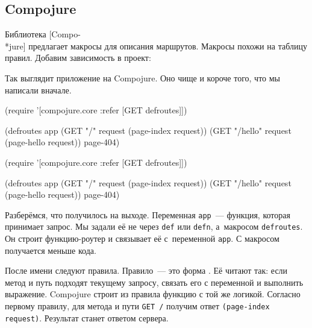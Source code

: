 \subsection{Compojure}

\label{compojure}


Библиотека [Compo-\\*jure]
предлагает макросы для описания маршрутов. Макросы похожи на таблицу правил.
Добавим зависимость в проект:

\begin{english}
  \begin{clojure}
[compojure "1.6.1"]
  \end{clojure}
\end{english}

Так выглядит приложение на Compojure. Оно чище и короче того, что мы написали
вначале.

\ifnarrow

\begin{english}
  \begin{clojure}
(require '[compojure.core
           :refer [GET defroutes]])

(defroutes app
  (GET "/" request
    (page-index request))
  (GET "/hello" request
    (page-hello request))
  page-404)
  \end{clojure}
\end{english}

\else

\begin{english}
  \begin{clojure}
(require '[compojure.core :refer [GET defroutes]])

(defroutes app
  (GET "/"      request (page-index request))
  (GET "/hello" request (page-hello request))
  page-404)
  \end{clojure}
\end{english}

\fi

Разберёмся, что получилось на выходе. Переменная \verb|app|~--- функция, которая
принимает запрос. Мы задали её не через \verb|def| или \verb|defn|, а~макросом
\verb|defroutes|. Он строит функцию-роутер и связывает её с~переменной
\verb|app|. С макросом получается меньше кода.

После имени следуют правила. Правило~--- это форма . Её читают так: если метод и путь подходят текущему
запросу, связать его с переменной и выполнить выражение. Compojure строит из
правила функцию с той же логикой. Согласно первому правилу, для метода и пути
\verb|GET /| получим ответ \verb|(page-index request)|. Результат станет ответом
сервера.

